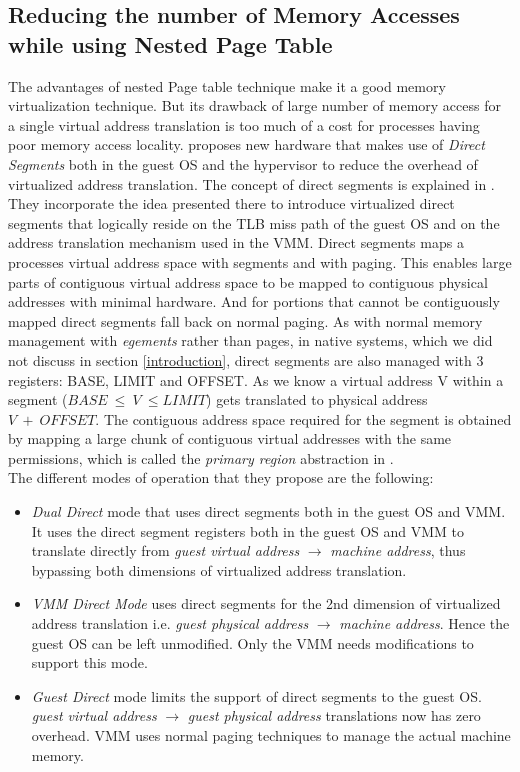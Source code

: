 \subsection{Reducing the number of Memory Accesses while using Nested Page Table}     
The advantages of nested Page table technique make it a good memory virtualization technique. But
its drawback of large number of memory access for a single virtual address translation is too much
of a cost for processes having poor memory access locality. \citet{gandhi2014efficient} proposes
new hardware that makes use of \textit{Direct Segments} both in the guest OS and the hypervisor to
reduce the overhead of virtualized address translation. The concept of direct segments is
explained in \citet{basu2013efficient}. They incorporate the idea presented there to introduce
virtualized direct segments that logically reside on the TLB miss path of the guest OS and on the
address translation mechanism used in the VMM. Direct segments maps a processes virtual address
space with segments and with paging. This enables large parts of contiguous virtual address space
to be mapped to contiguous physical addresses with minimal hardware. And for portions that cannot
be contiguously mapped direct segments fall back on normal paging. As with normal memory
management with \textit{egements} rather than pages, in native systems, which we did not discuss
in section \ref{introduction}, direct segments are also managed with 3 registers: BASE, LIMIT and
OFFSET. As we know a virtual address V within a segment ($BASE\ \leq\ V\ \leq LIMIT$) gets
translated to physical address $V\ +\ OFFSET$. The contiguous address space required for the
segment is obtained by mapping a large chunk of contiguous virtual addresses with the same
permissions, which is called the \textit{primary region} abstraction in \citet{basu2013efficient}.  
\\
The different modes of operation that they propose are the following:
\begin{itemize}
\item \textit{Dual Direct} mode that uses direct segments both in the guest OS and VMM. It uses
the direct segment registers both in the guest OS and VMM to translate directly from \textit{guest
virtual address} $\rightarrow$ \textit{machine address}, thus bypassing both dimensions of
virtualized address translation. 
\item \textit{VMM Direct Mode} uses direct segments for the 2nd dimension of virtualized address
translation i.e. \textit{guest physical address} $\rightarrow$ \textit{machine address}. Hence the
guest OS can be left unmodified. Only the VMM needs modifications to support this mode.
\item \textit{Guest Direct} mode limits the support of direct segments to the guest OS.
\textit{guest virtual address} $\rightarrow$ \textit{guest physical address} translations now has
zero overhead. VMM uses normal paging techniques to manage the actual machine memory. 
\end{itemize} 
